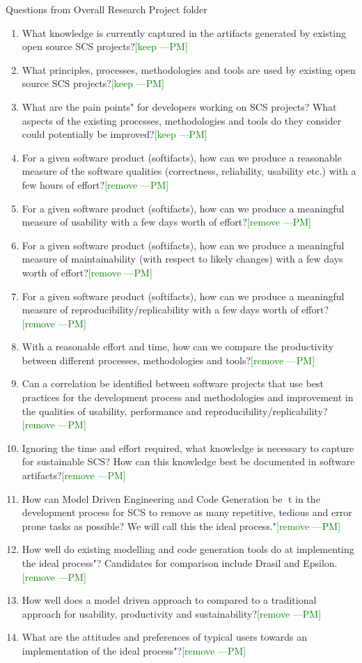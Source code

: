 \documentclass[letterpaper,cleveref]{lipics-v2019}
\newcommand{\authornote}[3]{\textcolor{#1}{[#3 ---#2]}}
\newcommand{\authornote}[3]{}
\newcommand{\pmi}[1]{\authornote{green}{PM}{#1}} %
\theoremstyle{definition}
\begin{document}
Questions from Overall Research Project folder
\begin{enumerate}
	\item What knowledge is currently captured in the artifacts generated by
	existing open source SCS projects?\pmi{keep}
	\item What principles, processes, methodologies and tools are used by existing open source SCS projects?\pmi{keep}
	\item What are the pain points" for developers working on SCS projects?
	What aspects of the existing processes, methodologies and tools do
	they consider could potentially be improved?\pmi{keep}
	\item For a given software product (softifacts), how can we produce a reasonable measure of the software qualities (correctness, reliability, usability etc.) with a few hours of effort?\pmi{remove}
	\item For a given software product (softifacts), how can we produce a meaningful measure of usability with a few days worth of effort?\pmi{remove}
	\item For a given software product (softifacts), how can we produce a meaningful measure of maintainability (with respect to likely changes) with
	a few days worth of effort?\pmi{remove}
	\item For a given software product (softifacts), how can we produce a meaningful measure of reproducibility/replicability with a few days worth of
	effort?\pmi{remove}
	\item With a reasonable effort and time, how can we compare the productivity between different processes, methodologies and tools?\pmi{remove}
	\item Can a correlation be identified between software projects that use
	best practices for the development process and methodologies and improvement in the qualities of usability, performance and reproducibility/replicability?\pmi{remove}
	\item Ignoring the time and effort required, what knowledge is necessary to
	capture for sustainable SCS? How can this knowledge best be documented in software artifacts?\pmi{remove}
	\item How can Model Driven Engineering and Code Generation be t in the
	development process for SCS to remove as many repetitive, tedious and
	error prone tasks as possible? We will call this the ideal process."\pmi{remove}
	\item How well do existing modelling and code generation tools do at implementing the ideal process"? Candidates for comparison include Drasil
	and Epsilon.\pmi{remove}
	\item How well does a model driven approach to compared to a traditional
	approach for usability, productivity and sustainability?\pmi{remove}
	\item What are the attitudes and preferences of typical users towards an
	implementation of the ideal process"?\pmi{remove}
\end{enumerate}
\end{document}
